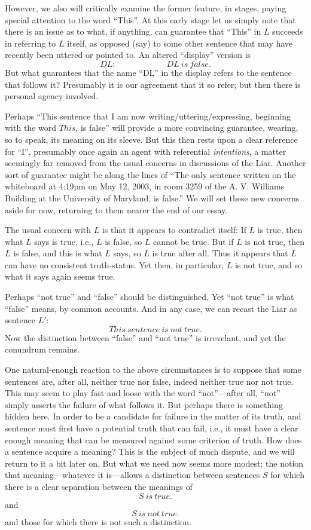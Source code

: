 \documentclass{amsart}
\begin{document}
However, we also will critically examine the former feature, in
stages, paying special attention to the word ``This''.  At this early
stage let us simply note that there is an issue as to what, if
anything, can guarantee that ``This'' in $L$ succeeds in referring to
$L$ itself, as opposed (say) to some other sentence that may have
recently been uttered or pointed to.  An altered ``display'' version
is 
$$DL: \hspace{1in} DL~ is ~false.$$
\smallskip
\noindent
But what guarantees that the name ``DL'' in the display refers to
the sentence that follows it? Presumably it is our agreement that it
so refer; but then there is personal agency involved.

Perhaps ``This sentence that I 
am now writing/uttering/expressing, beginning with the word $This$, is
false'' will provide a more convincing guarantee, wearing, so to
speak, its meaning on its sleeve. But this then rests upon a clear
reference for ``I'', presumably once again an agent with referential
{\em intentions}, 
a matter seemingly far removed from the usual concerns in discussions
of the Liar. Another sort of guarantee might be along the lines of ``The
only sentence written on the whiteboard at 4:19pm on May 12, 2003, in
room 3259 of the A. V. Williams Building at the University of
Maryland, is false.'' We will set these new concerns aside for now,
returning to them nearer the end of our essay.

The usual concern with $L$ is that it appears to contradict itself: If
$L$ is true, then what $L$ says is true, i.e., $L$ is false, so $L$
cannot be true.  But if $L$ is not true, then $L$ is false, and this
is what $L$ says, so $L$ is true after all.  Thus it appears that $L$
can have no consistent truth-status.  Yet then, in particular, $L$ is
not true, and so what it says again seems true.

Perhaps ``not true'' and ``false'' should be distinguished.  Yet ``not
true'' is what ``false'' means, by common accounts.  And in any case,
we can recast the Liar as sentence $L'$:
$$This ~sentence~ is ~not ~true.$$
\smallskip
\noindent
Now the distinction between ``false'' and ``not true'' is irrevelant,
and yet the conundrum remains.


One natural-enough reaction to the above circumstances is to
suppose that some sentences are, after all, neither true nor false,
indeed neither true nor not true.  This may seem to play fast and
loose with the word ``not''---after all, ``not'' simply asserts the
failure of what follows it.  But perhaps there is something hidden
here.  In order to be a candidate for failure in the matter of its
truth, and sentence must first have a potential truth that can fail,
i.e., it must have a clear enough meaning that can be
measured against some criterion of truth. How does a sentence acquire
a meaning? This is the subject of much dispute, and we will return to
it a bit later on. But what we need now seems more modest: the notion
that meaning---whatever it is---allows a distinction between
sentences $S$ for which there is a clear separation between the
meanings of 
\smallskip
$$S ~ is ~ true.$$
and
$$S ~ is ~ not ~ true.$$
\smallskip
and those for which there is not such a distinction.
\end{document}
